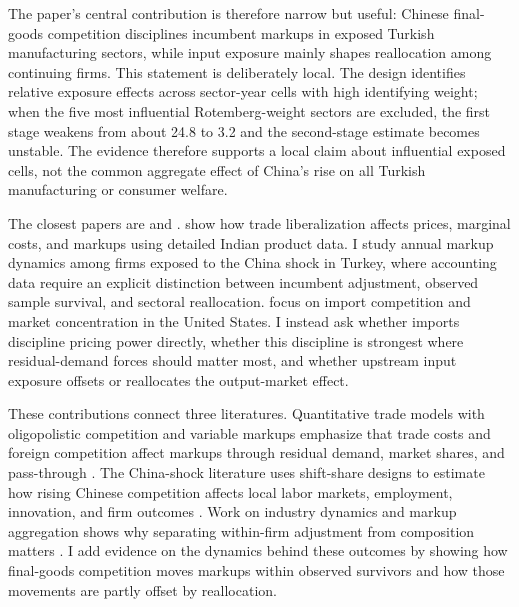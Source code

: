 ﻿\documentclass[12pt]{article}
\begin{document}
The paper's central contribution is therefore narrow but useful: Chinese final-goods competition disciplines incumbent markups in exposed Turkish manufacturing sectors, while input exposure mainly shapes reallocation among continuing firms. This statement is deliberately local. The design identifies relative exposure effects across sector-year cells with high identifying weight; when the five most influential Rotemberg-weight sectors are excluded, the first stage weakens from about 24.8 to 3.2 and the second-stage estimate becomes unstable. The evidence therefore supports a local claim about influential exposed cells, not the common aggregate effect of China's rise on all Turkish manufacturing or consumer welfare.

The closest papers are \textcite{deloeckerPricesMarkupsTrade2016} and \textcite{amitiUSMarketConcentration2025}. \textcite{deloeckerPricesMarkupsTrade2016} show how trade liberalization affects prices, marginal costs, and markups using detailed Indian product data. I study annual markup dynamics among firms exposed to the China shock in Turkey, where accounting data require an explicit distinction between incumbent adjustment, observed sample survival, and sectoral reallocation. \textcite{amitiUSMarketConcentration2025} focus on import competition and market concentration in the United States. I instead ask whether imports discipline pricing power directly, whether this discipline is strongest where residual-demand forces should matter most, and whether upstream input exposure offsets or reallocates the output-market effect.

These contributions connect three literatures. Quantitative trade models with oligopolistic competition and variable markups emphasize that trade costs and foreign competition affect markups through residual demand, market shares, and pass-through \parencite{deblasUnderstandingMarkupsOpen2015,atkesonPricingtoMarketTradeCosts2008,gaubertGranularComparativeAdvantage2021}. The China-shock literature uses shift-share designs to estimate how rising Chinese competition affects local labor markets, employment, innovation, and firm outcomes \parencite{autorChinaSyndromeLocal2013,autorTradeAdjustmentWorkerLevel2014,acemogluImportCompetitionGreat2016,pierceSurprisinglySwiftDecline2016,aghionOpposingFirmLevelResponses2024,bloomTradeInducedTechnical2016}. Work on industry dynamics and markup aggregation shows why separating within-firm adjustment from composition matters \parencite{melitzImpactTradeIntraIndustry2003,ericsonMarkovPerfectIndustryDynamics1995,hopenhaynEntryExitFirm1992,bursteinBottomUpMarkupFluctuations2025,baqaeeProductivityMisallocationGeneral2020}. I add evidence on the dynamics behind these outcomes by showing how final-goods competition moves markups within observed survivors and how those movements are partly offset by reallocation.
\end{document}
